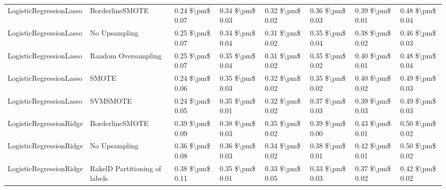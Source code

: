 \begin{tabular}{llllllll}
        LogisticRegressionLasso &               BorderlineSMOTE & 0.24 \$\textbackslash pm\$ 0.07 &           0.34 \$\textbackslash pm\$ 0.03 &       0.32 \$\textbackslash pm\$ 0.02 &        0.36 \$\textbackslash pm\$ 0.03 &                         0.39 \$\textbackslash pm\$ 0.01 & 0.48 \$\textbackslash pm\$ 0.04 \\
        LogisticRegressionLasso &                 No Upsampling & 0.25 \$\textbackslash pm\$ 0.07 &           0.34 \$\textbackslash pm\$ 0.04 &       0.31 \$\textbackslash pm\$ 0.02 &        0.35 \$\textbackslash pm\$ 0.04 &                         0.38 \$\textbackslash pm\$ 0.02 & 0.46 \$\textbackslash pm\$ 0.03 \\
        LogisticRegressionLasso &           Random Oversampling & 0.25 \$\textbackslash pm\$ 0.07 &           0.35 \$\textbackslash pm\$ 0.04 &       0.31 \$\textbackslash pm\$ 0.02 &        0.35 \$\textbackslash pm\$ 0.02 &                         0.40 \$\textbackslash pm\$ 0.01 & 0.48 \$\textbackslash pm\$ 0.04 \\
        LogisticRegressionLasso &                         SMOTE & 0.24 \$\textbackslash pm\$ 0.06 &           0.35 \$\textbackslash pm\$ 0.03 &       0.32 \$\textbackslash pm\$ 0.02 &        0.35 \$\textbackslash pm\$ 0.02 &                         0.40 \$\textbackslash pm\$ 0.02 & 0.49 \$\textbackslash pm\$ 0.03 \\
        LogisticRegressionLasso &                      SVMSMOTE & 0.24 \$\textbackslash pm\$ 0.05 &           0.35 \$\textbackslash pm\$ 0.01 &       0.32 \$\textbackslash pm\$ 0.02 &        0.37 \$\textbackslash pm\$ 0.03 &                         0.39 \$\textbackslash pm\$ 0.03 & 0.49 \$\textbackslash pm\$ 0.03 \\
        LogisticRegressionRidge &               BorderlineSMOTE & 0.39 \$\textbackslash pm\$ 0.09 &           0.38 \$\textbackslash pm\$ 0.03 &       0.35 \$\textbackslash pm\$ 0.02 &        0.39 \$\textbackslash pm\$ 0.00 &                         0.43 \$\textbackslash pm\$ 0.01 & 0.50 \$\textbackslash pm\$ 0.02 \\
        LogisticRegressionRidge &                 No Upsampling & 0.36 \$\textbackslash pm\$ 0.08 &           0.36 \$\textbackslash pm\$ 0.03 &       0.34 \$\textbackslash pm\$ 0.02 &        0.38 \$\textbackslash pm\$ 0.01 &                         0.42 \$\textbackslash pm\$ 0.01 & 0.50 \$\textbackslash pm\$ 0.02 \\
        LogisticRegressionRidge & RakelD Partitioning of labels & 0.38 \$\textbackslash pm\$ 0.11 &           0.35 \$\textbackslash pm\$ 0.01 &       0.33 \$\textbackslash pm\$ 0.05 &        0.33 \$\textbackslash pm\$ 0.03 &                         0.37 \$\textbackslash pm\$ 0.02 & 0.42 \$\textbackslash pm\$ 0.02 \\

\end{tabular}
